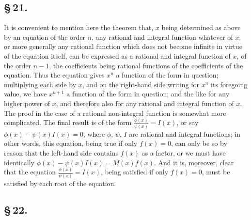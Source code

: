 \documentclass[11pt,a4paper]{article}
\begin{document}
\subsection*{\S\,21.}

It is convenient to mention here the theorem that, $x$ being determined as above by an equation of the order $n$, any rational and integral function whatever of $x$, or more generally any rational function which does not become infinite in virtue of the equation itself, can be expressed as a rational and integral function of $x$, of the order $n - 1$, the coefficients being rational functions of the coefficients of the equation. Thus the equation gives $x^{n}$ a function of the form in question; multiplying each side by $x$, and on the right-hand side writing for $x^{n}$ its foregoing value, we have $x^{n+1}$ a function of the form in question; and the like for any higher power of $x$, and therefore also for any rational and integral function of $x$. The proof in the case of a rational non-integral function is somewhat more complicated. The final result is of the form $\frac{\phi(x)}{\psi(x)} = I(x)$, or say $\phi(x) - \psi(x)I(x) = 0$, where $\phi$, $\psi$, $I$ are rational and integral functions; in other words, this equation, being true if only $f(x) = 0$, can only be so by reason that the left-hand side contains $f(x)$ as a factor, or we must have identically $\phi(x) - \psi(x)I(x) = M(x)f(x)$. And it is, moreover, clear that the equation $\frac{\phi(x)}{\psi(x)} = I(x)$, being satisfied if only $f(x) = 0$, must be satisfied by each root of the equation.

\subsection*{\S\,22.}
\end{document}
